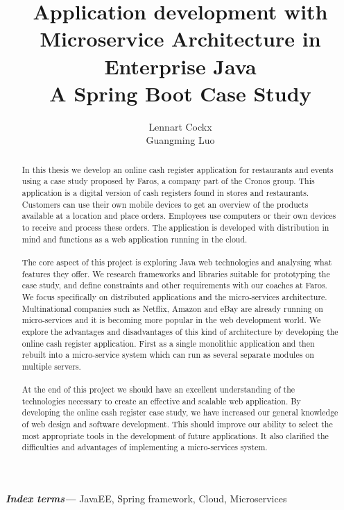 \documentclass[12pt]{article}
\title{Application development with\\ Microservice Architecture in Enterprise Java\\ A Spring Boot Case Study}
\author{Lennart Cockx\\Guangming Luo}
\providecommand{\keywords}[1]{\textbf{\textit{Index terms---}} #1}
\begin{document}
\maketitle
\newpage
\tableofcontents
\newpage

\begin{abstract}
\noindent In this thesis we develop an online cash register application for restaurants and events using a case study proposed by Faros, a company part of the Cronos group. This application is a digital version of cash registers found in stores and restaurants. Customers can use their own mobile devices to get an overview of the products available at a location and place orders. Employees  use computers or their own devices to receive and process these orders. The application is developed with distribution in mind and functions as a web application running in the cloud. 
\\\\
The core aspect of this project is exploring Java web technologies and analysing what features they offer. We research frameworks and libraries suitable for prototyping the case study, and define constraints and other requirements with our coaches at Faros. We focus specifically on distributed applications and the micro-services architecture. Multinational companies such as Netflix, Amazon and eBay are already running on micro-services and it is becoming more popular in the web development world. We explore the advantages and disadvantages of this kind of architecture by developing the online cash register application. First as a single monolithic application and then rebuilt into a micro-service system which can run as several separate modules on multiple servers.
\\\\
At the end of this project we should have an excellent understanding of the technologies necessary to create an effective and scalable web application. By developing the online cash register case study, we have increased our general knowledge of web design and software development. This should improve our ability to select the most appropriate tools in the development of future applications. It also clarified the difficulties and advantages of implementing a micro-services system. 
\end{abstract}
\keywords{JavaEE, Spring framework, Cloud, Microservices}


\end{document}
